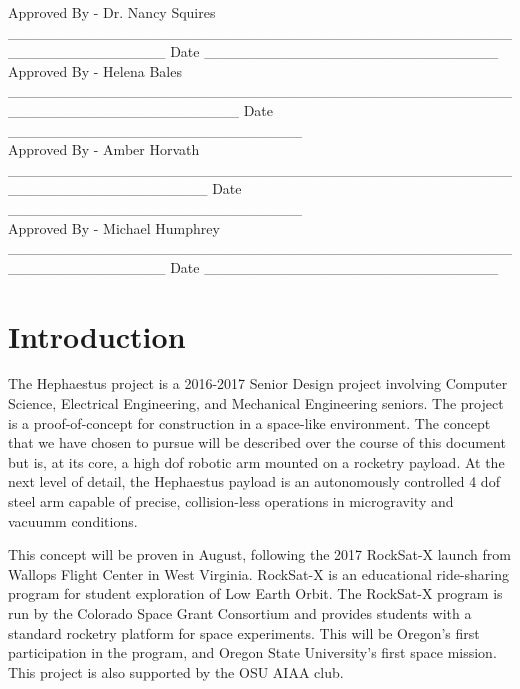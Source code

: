 \documentclass[letterpaper,10pt]{article}
\newenvironment{bottompar}{\par\vspace*{\fill}}{\clearpage}
\begin{document}
\begin{bottompar}
Approved By - Dr. Nancy Squires
\_\_\_\_\_\_\_\_\_\_\_\_\_\_\_\_\_\_\_\_\_\_\_\_\_\_\_\_\_\_\_\_\_\_\_\_\_\_\_\_\_\_\_\_\_\_\_\_\_\_\_\_\_\_\_\_\_\_\_\_\_\_\_
Date \_\_\_\_\_\_\_\_\_\_\_\_\_\_\_\_\_\_\_\_\_\_\_\_\_\_\_\_ \\


Approved By - Helena Bales
\_\_\_\_\_\_\_\_\_\_\_\_\_\_\_\_\_\_\_\_\_\_\_\_\_\_\_\_\_\_\_\_\_\_\_\_\_\_\_\_\_\_\_\_\_\_\_\_\_\_\_\_\_\_\_\_\_\_\_\_\_\_\_\_\_\_\_\_\_\_
Date \_\_\_\_\_\_\_\_\_\_\_\_\_\_\_\_\_\_\_\_\_\_\_\_\_\_\_\_ \\


Approved By - Amber Horvath
\_\_\_\_\_\_\_\_\_\_\_\_\_\_\_\_\_\_\_\_\_\_\_\_\_\_\_\_\_\_\_\_\_\_\_\_\_\_\_\_\_\_\_\_\_\_\_\_\_\_\_\_\_\_\_\_\_\_\_\_\_\_\_\_\_\_\_
Date \_\_\_\_\_\_\_\_\_\_\_\_\_\_\_\_\_\_\_\_\_\_\_\_\_\_\_\_ \\


Approved By - Michael Humphrey
\_\_\_\_\_\_\_\_\_\_\_\_\_\_\_\_\_\_\_\_\_\_\_\_\_\_\_\_\_\_\_\_\_\_\_\_\_\_\_\_\_\_\_\_\_\_\_\_\_\_\_\_\_\_\_\_\_\_\_\_\_\_\_
Date \_\_\_\_\_\_\_\_\_\_\_\_\_\_\_\_\_\_\_\_\_\_\_\_\_\_\_\_ \\
\end{bottompar}

\clearpage
\tableofcontents
\clearpage

\section{Introduction}
The Hephaestus project is a 2016-2017 Senior Design project involving Computer Science, Electrical Engineering, and Mechanical Engineering seniors. The project is a proof-of-concept for construction in a space-like environment. The concept that we have chosen to pursue will be described over the course of this document but is, at its core, a high \gls{dof} robotic arm mounted on a rocketry payload. At the next level of detail, the Hephaestus payload is an autonomously controlled 4 \gls{dof} steel arm capable of precise, collision-less operations in microgravity and vacuumm conditions. 

This concept will be proven in August, following the 2017 RockSat-X launch from Wallops Flight Center in West Virginia. RockSat-X is an educational ride-sharing program for student exploration of Low Earth Orbit. The RockSat-X program is run by the Colorado Space Grant Consortium and provides students with a standard rocketry platform for space experiments. This will be Oregon's first participation in the program, and Oregon State University's first space mission. This project is also supported by the OSU AIAA club.
\end{document}
